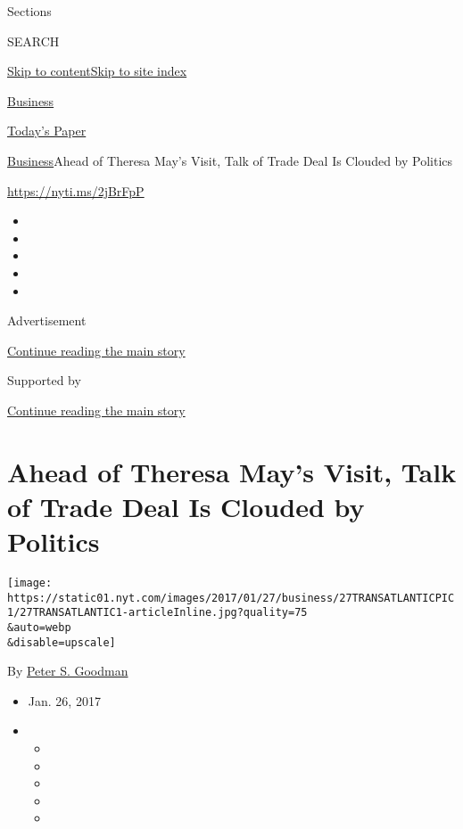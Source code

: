 Sections

SEARCH

\protect\hyperlink{site-content}{Skip to
content}\protect\hyperlink{site-index}{Skip to site index}

\href{https://www.nytimes.com/section/business}{Business}

\href{https://myaccount.nytimes.com/auth/login?response_type=cookie\&client_id=vi}{}

\href{https://www.nytimes.com/section/todayspaper}{Today's Paper}

\href{/section/business}{Business}\textbar{}Ahead of Theresa May's
Visit, Talk of Trade Deal Is Clouded by Politics

\url{https://nyti.ms/2jBrFpP}

\begin{itemize}
\item
\item
\item
\item
\item
\end{itemize}

Advertisement

\protect\hyperlink{after-top}{Continue reading the main story}

Supported by

\protect\hyperlink{after-sponsor}{Continue reading the main story}

\hypertarget{ahead-of-theresa-mays-visit-talk-of-trade-deal-is-clouded-by-politics}{%
\section{Ahead of Theresa May's Visit, Talk of Trade Deal Is Clouded by
Politics}\label{ahead-of-theresa-mays-visit-talk-of-trade-deal-is-clouded-by-politics}}

\texttt{[image: https://static01.nyt.com/images/2017/01/27/business/27TRANSATLANTICPIC1/27TRANSATLANTIC1-articleInline.jpg?quality=75\\\&auto=webp\\\&disable=upscale]}

By \href{http://www.nytimes.com/by/peter-s-goodman}{Peter S. Goodman}

\begin{itemize}
\item
  Jan. 26, 2017
\item
  \begin{itemize}
  \item
  \item
  \item
  \item
  \item
  \end{itemize}
\end{itemize}

